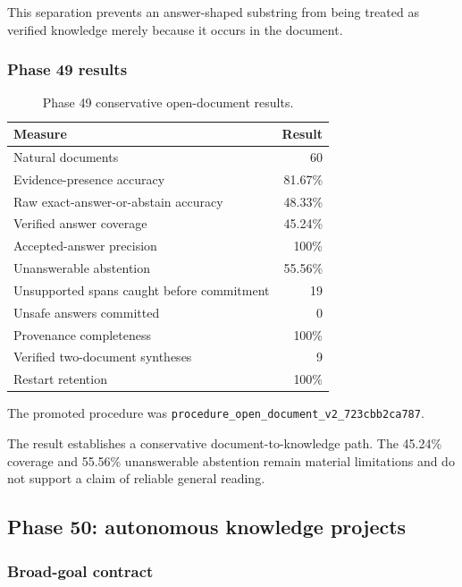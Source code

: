 This separation prevents an answer-shaped substring from being treated as
verified knowledge merely because it occurs in the document.

\subsubsection{Phase 49 results}

\begin{table}[htbp]
\centering
\begin{tabular}{lr}
\hline
\textbf{Measure} & \textbf{Result}\\
\hline
Natural documents & 60\\
Evidence-presence accuracy & 81.67\%\\
Raw exact-answer-or-abstain accuracy & 48.33\%\\
Verified answer coverage & 45.24\%\\
Accepted-answer precision & 100\%\\
Unanswerable abstention & 55.56\%\\
Unsupported spans caught before commitment & 19\\
Unsafe answers committed & 0\\
Provenance completeness & 100\%\\
Verified two-document syntheses & 9\\
Restart retention & 100\%\\
\hline
\end{tabular}
\caption{Phase 49 conservative open-document results.}
\label{tab:phase49-results}
\end{table}

The promoted procedure was
\texttt{procedure\_open\_document\_v2\_723cbb2ca787}.

The result establishes a conservative document-to-knowledge path.  The
45.24\% coverage and 55.56\% unanswerable abstention remain material
limitations and do not support a claim of reliable general reading.

\subsection{Phase 50: autonomous knowledge projects}
\label{subsec:phase50-autonomous-projects}

\subsubsection{Broad-goal contract}

